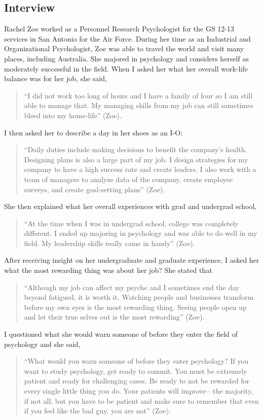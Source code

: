 \begin{multicols}{2}
\section{Interview}
    Rachel Zoe worked as a Personnel Research Psychologist for the GS 12-13 services in San Antonio for the Air Force. During her time as an Industrial and Organizational Psychologist, Zoe was able to travel the world and visit many places, including Australia. She majored in psychology and considers herself as moderately successful in the field. When I asked her what her overall work-life balance was for her job, she said,
    \begin{quote}
        “I did not work too long of hours and I have a family of four so I am still able to manage that. My managing skills from my job can still sometimes bleed into my home-life” (Zoe). 
    \end{quote}
    I then asked her to describe a day in her shoes as an I-O; 
    \begin{quote}
        “Daily duties include making decisions to benefit the company’s health. Designing plans is also a large part of my job. I design strategies for my company to have a high success  rate and create leaders. I also work with a team of managers to analyze data of the company, create employee surveys, and create goal-setting plans” (Zoe). 
    \end{quote}
    She then explained what her overall experiences with grad and undergrad school,  
    \begin{quote}
        “At the time when I was in undergrad school, college was completely different. I ended up majoring in psychology and was able to do well in my field. My leadership skills really came in handy” (Zoe). 
    \end{quote}
    After receiving insight on her undergraduate and graduate experience, I asked her what the most rewarding thing was about her job? She stated that 
    \begin{quote}
        “Although my job can affect my psyche and I sometimes end the day beyond fatigued, it is worth it. Watching people and businesses transform before my own eyes is the most rewarding thing. Seeing people open up and let their true selves out is the most rewarding” (Zoe). 
    \end{quote}
    I questioned what she would warn someone of before they enter the field of psychology and she said, 
    \begin{quote}
        “What would you warn someone of before they enter psychology? If you want to study psychology, get ready to commit. You must be extremely patient and ready for challenging cases. Be ready to not be rewarded for every single little thing you do. Your patients will improve—the majority, if not all, but you have to be patient and make sure to remember that even if you feel like the bad guy, you are not” (Zoe). 
    \end{quote}


\end{multicols}
